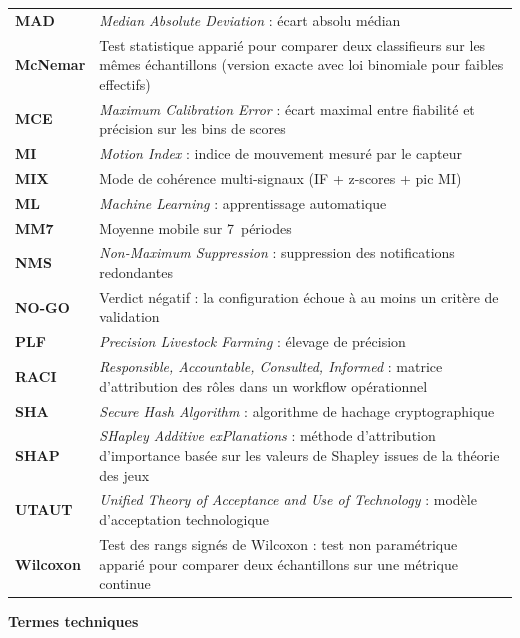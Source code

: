 \begin{longtable}{@{}lp{11cm}@{}}
\textbf{MAD}     & \textit{Median Absolute Deviation} : écart absolu médian \\[3pt]
\textbf{McNemar} & Test statistique apparié pour comparer deux classifieurs sur les mêmes échantillons (version exacte avec loi binomiale pour faibles effectifs) \\[3pt]
\textbf{MCE}     & \textit{Maximum Calibration Error} : écart maximal entre fiabilité et précision sur les bins de scores \\[3pt]
\textbf{MI}      & \textit{Motion Index} : indice de mouvement mesuré par le capteur \\[3pt]
\textbf{MIX}     & Mode de cohérence multi-signaux (IF + z-scores + pic MI) \\[3pt]
\textbf{ML}      & \textit{Machine Learning} : apprentissage automatique \\[3pt]
\textbf{MM7}     & Moyenne mobile sur 7~périodes \\[3pt]
\textbf{NMS}     & \textit{Non-Maximum Suppression} : suppression des notifications redondantes \\[3pt]
\textbf{NO-GO}   & Verdict négatif : la configuration échoue à au moins un critère de validation \\[3pt]
\textbf{PLF}     & \textit{Precision Livestock Farming} : élevage de précision \\[3pt]
\textbf{RACI}    & \textit{Responsible, Accountable, Consulted, Informed} : matrice d'attribution des rôles dans un workflow opérationnel \\[3pt]
\textbf{SHA}     & \textit{Secure Hash Algorithm} : algorithme de hachage cryptographique \\[3pt]
\textbf{SHAP}    & \textit{SHapley Additive exPlanations} : méthode d'attribution d'importance basée sur les valeurs de Shapley issues de la théorie des jeux \\[3pt]
\textbf{UTAUT}   & \textit{Unified Theory of Acceptance and Use of Technology} : modèle d'acceptation technologique \\[3pt]
\textbf{Wilcoxon} & Test des rangs signés de Wilcoxon : test non paramétrique apparié pour comparer deux échantillons sur une métrique continue \\[3pt]
\end{longtable}

\newpage

\noindent\textbf{Termes techniques}

\vspace{0.5em}

